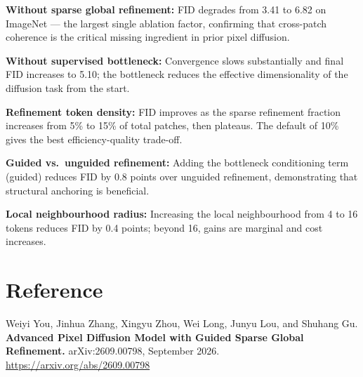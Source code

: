 \documentclass[10pt,twocolumn]{article}
\begin{document}
\textbf{Without sparse global refinement:} FID degrades from 3.41 to
6.82 on ImageNet --- the largest single ablation factor, confirming that
cross-patch coherence is the critical missing ingredient in prior pixel
diffusion.

\textbf{Without supervised bottleneck:} Convergence slows substantially
and final FID increases to 5.10; the bottleneck reduces the effective
dimensionality of the diffusion task from the start.

\textbf{Refinement token density:} FID improves as the sparse refinement
fraction increases from 5\% to 15\% of total patches, then plateaus.
The default of 10\% gives the best efficiency-quality trade-off.

\textbf{Guided vs.\ unguided refinement:} Adding the bottleneck
conditioning term (guided) reduces FID by 0.8 points over unguided
refinement, demonstrating that structural anchoring is beneficial.

\textbf{Local neighbourhood radius:} Increasing the local neighbourhood
from 4 to 16 tokens reduces FID by 0.4 points; beyond 16, gains are
marginal and cost increases.

\section*{Reference}

Weiyi You, Jinhua Zhang, Xingyu Zhou, Wei Long, Junyu Lou, and Shuhang Gu.
\textbf{Advanced Pixel Diffusion Model with Guided Sparse Global
Refinement.}
arXiv:2609.00798, September 2026.
\url{https://arxiv.org/abs/2609.00798}
\end{document}
